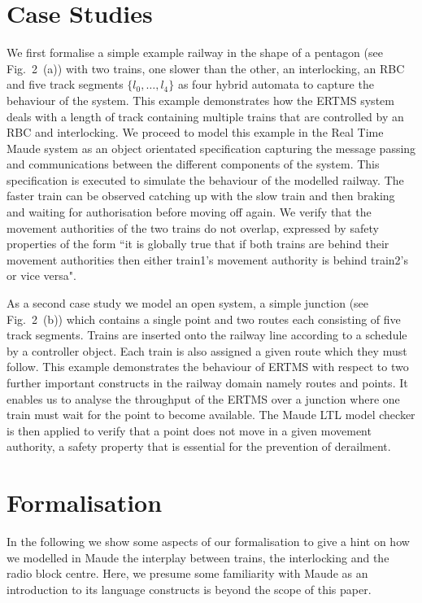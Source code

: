\documentclass[runningheads,a4paper]{llncs}
\begin{document}
\section{Case Studies} 
We first formalise a simple example railway in
the shape of a pentagon (see Fig.~2~(a)) with two trains, one slower
than the other, an interlocking, an RBC and five track segments
$\{l_0, \ldots, l_4 \}$ as four hybrid automata to capture the
behaviour of the system. This example demonstrates how the ERTMS
system deals with a length of track containing multiple trains that
are controlled by an RBC and interlocking. We proceed to model
this example in the Real Time Maude system as an object
orientated specification capturing the message passing and
communications between the different components of the system. This
specification is executed to simulate the behaviour of the modelled
railway. The faster train can be observed catching up with the slow train
and then braking and waiting for authorisation before moving off
again. We verify that the movement authorities of the two trains do
not overlap, expressed by safety properties of the form ``it
is globally true that if both trains are behind their movement
authorities then either train1's movement authority is behind train2's 
or vice versa".

As a second case study we model an open system, a simple junction (see
Fig.~2~(b)) which contains a single point and two routes each
consisting of five track segments. Trains are inserted onto the
railway line according to a schedule by a controller object. Each train is also assigned a
given route which they must follow. This example demonstrates the
behaviour of ERTMS with respect to two further important constructs in
the railway domain namely routes and points. It enables us to analyse
the throughput of the ERTMS over a junction where one train
must wait for the point to become available. The Maude LTL model
checker is then applied to verify that a point does not move in a
given movement authority, a safety property that is essential for the
prevention of derailment. 

\section{Formalisation} In the following we show some aspects
of our formalisation to give a hint on how we modelled in Maude the
interplay between trains, the interlocking and the radio block
centre. Here, we presume some familiarity with Maude as an introduction
to its language constructs is beyond the scope of this paper.
\end{document}
